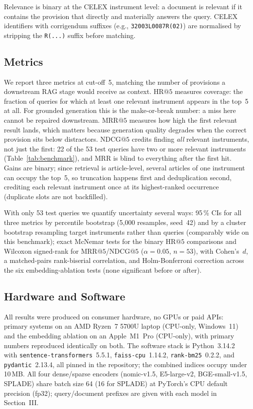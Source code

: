 \documentclass[conference,a4paper]{IEEEtran}
\makeatletter
\newcommand{\HR}[1]{\mathrm{HR}@{#1}}
\newcommand{\MRR}[1]{\mathrm{MRR}@{#1}}
\newcommand{\NDCG}[1]{\mathrm{NDCG}@{#1}}
\makeatother
\begin{document}
Relevance is binary at the CELEX instrument level: a document is
relevant if it contains the provision that directly and materially
answers the query.
CELEX identifiers with corrigendum suffixes (e.g.,
\texttt{32003L0087R(02)}) are normalised by stripping the
\texttt{R(...)} suffix before matching.

\subsection{Metrics}

We report three metrics at cut-off~5, matching the number of
provisions a downstream RAG stage would receive as context.
$\HR{5}$ measures coverage: the fraction of queries for which at
least one relevant instrument appears in the top~5 at all.
For grounded generation this is the make-or-break number: a miss
here cannot be repaired downstream.
$\MRR{5}$ measures how high the first relevant result lands, which
matters because generation quality degrades when the correct
provision sits below distractors.
$\NDCG{5}$ credits finding \emph{all} relevant instruments, not just
the first: 22 of the 53 test queries have two or more relevant
instruments (Table~\ref{tab:benchmark}), and MRR is blind to
everything after the first hit.
Gains are binary; since retrieval is article-level, several articles
of one instrument can occupy the top~5, so truncation happens first
and deduplication second, crediting each relevant instrument once at
its highest-ranked occurrence (duplicate slots are not backfilled).

With only 53 test queries we quantify uncertainty several ways: 95\,\%
CIs for all three metrics by percentile bootstrap (5{,}000 resamples,
seed~42) and by a cluster bootstrap resampling target instruments
rather than queries (comparably wide on this benchmark); exact
McNemar tests for the binary $\HR{5}$ comparisons and Wilcoxon
signed-rank for $\MRR{5}$/$\NDCG{5}$ ($\alpha{=}0.05$, $n{=}53$),
with Cohen's~$d$, a matched-pairs rank-biserial correlation, and
Holm-Bonferroni correction across the six embedding-ablation tests
(none significant before or after).

\subsection{Hardware and Software}

All results were produced on consumer hardware, no GPUs or paid APIs:
primary systems on an AMD Ryzen~7 5700U laptop (CPU-only, Windows~11)
and the embedding ablation on an Apple~M1~Pro (CPU-only), with primary
numbers reproduced identically on both.
The software stack is Python~3.14.2 with
\texttt{sentence-transformers}~5.5.1, \texttt{faiss-cpu}~1.14.2,
\texttt{rank-bm25}~0.2.2, and \texttt{pydantic}~2.13.4, all pinned in
the repository; the combined indices occupy under 10\,MB.
All four dense/sparse encoders (nomic-v1.5, E5-large-v2,
BGE-small-v1.5, SPLADE) share batch size 64 (16 for SPLADE) at
PyTorch's CPU default precision (fp32); query/document prefixes are
given with each model in Section~III.
\end{document}
